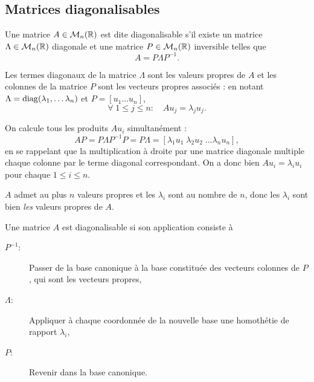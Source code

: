 \subsection{Matrices diagonalisables} \label{sec:MatDiag}

\begin{definition} \label{def:matriceDiagonalisable}
  Une matrice $A \in \mathcal{M}_n(\mathbb{R})$ est dite diagonalisable s'il existe un matrice $\Lambda \in \mathcal{M}_n(\mathbb{R})$ diagonale et une matrice $P \in \mathcal{M}_n(\mathbb{R})$ inversible telles que
  $$
  A = P \Lambda P^{-1}.
  $$
\end{definition}

\begin{proposition}
  Les termes diagonaux de la matrice $\Lambda$ sont les valeurs propres de $A$ et les colonnes de la matrice $P$ sont les vecteurs propres associés :
  en notant $\Lambda = \operatorname{diag}(\lambda_1, \dots \lambda_n)$ et $P = [u_1 \dots u_n]$, 
  $$
  \forall \; 1 \leq j \leq n: \quad A u_j = \lambda_j u_j.
  $$
\end{proposition}

\proof
  On calcule tous les produits $A u_i$ simultanément : 
  $$
  A P 
  = P \Lambda P^{-1} P 
  = P \Lambda
  = [\lambda_1 u_1 \; \lambda_2 u_2 \; \dots \lambda_n u_n],
  $$
  en se rappelant que la multiplication à droite par une matrice diagonale multiple chaque colonne par le terme diagonal correspondant. On a donc bien $A u_i = \lambda_i u_i$ pour chaque $1 \leq i \leq n$. \\
\eproof

\remark
$A$ admet au plus $n$ valeurs propres et les $\lambda_i$ sont au nombre de $n$, donc les $\lambda_i$ sont bien {\em les} valeurs propres de $A$.

\remark
Une matrice $A$ est diagonalisable si son application consiste à
\begin{description}
 \item[$P^{-1}$:] Passer de la base canonique à la base constituée des vecteurs colonnes de $P$, qui sont les vecteurs propres,
 \item[$\Lambda$:] Appliquer à chaque coordonnée de la nouvelle base une homothétie de rapport $\lambda_i$,
 \item[$P$:] Revenir dans la base canonique.
\end{description}

